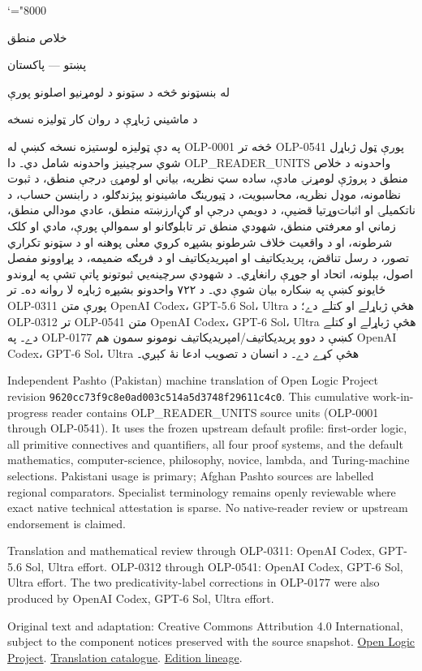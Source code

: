 \documentclass[11pt,a4paper,oneside]{report}
\theoremstyle{definition}
\begin{document}
\setRTL
\mathcode`\!="8000
\begin{titlepage}
\thispagestyle{empty}
\begin{center}
\vspace*{22mm}
{\Huge خلاص منطق}\par\bigskip
{\Large پښتو — پاکستان}\par\bigskip
{\LARGE له بنسټونو څخه د سټونو د لومړنيو اصلونو پورې}\par\bigskip
د ماشيني ژباړې د روان کار ټوليزه نسخه
\end{center}
\bigskip
په دې ټوليزه لوستيزه نسخه کښې له OLP-0001 څخه تر OLP-0541 پورې
ټول ژباړل شوي سرچينيز واحدونه شامل دي۔ دا OLP_READER_UNITS واحدونه د
خلاص منطق د پروژې لومړنۍ مادې، ساده سټ نظريه، بياني او لومړۍ درجې
منطق، د ثبوت نظامونه، موډل نظريه، محاسبويت، د ټيورينګ ماشينونو
پېژندګلو، د رابنسن حساب، د ناتکميلۍ او اثبات‌وړتيا قضيې، د دويمې درجې او
ګڼ‌ارزښته منطق، عادي مودالي منطق، زماني او معرفتي منطق، شهودي منطق
تر تابلوګانو او سموالې پورې، مادي او کلک شرطونه، او د واقعيت خلاف
شرطونو بشپړه کروي معنٰی پوهنه او د سټونو تکراري تصور،
د رسل تناقض، پريديکاتيف او امپريديکاتيف او د فرېګه ضميمه، د پړاوونو مفصل اصول، بېلونه، اتحاد او جوړې رانغاړي۔ د شهودي سرچينه‌يي ثبوتونو پاتې
تشې په اړوندو ځايونو کښې په ښکاره بيان شوې دي۔
د ۷۲۲ واحدونو بشپړه ژباړه لا روانه ده۔ تر OLP-0311 پورې متن
OpenAI Codex، GPT-5.6 Sol، Ultra هڅې ژباړلے او کتلے دے؛
د OLP-0312 تر OLP-0541 متن OpenAI Codex، GPT-6 Sol، Ultra
هڅې ژباړلے او کتلے دے۔ په OLP-0177 کښې د دوو پريديکاتيف/امپريديکاتيف
نومونو سمون هم OpenAI Codex، GPT-6 Sol، Ultra هڅې کړے دے۔
د انسان د تصويب ادعا نۀ کېږي۔

\begin{LTR}\latinfont\small
Independent Pashto (Pakistan) machine translation of Open Logic Project
revision \texttt{9620cc73f9c8e0ad003c514a5d3748f29611c4c0}. This cumulative
work-in-progress reader contains OLP_READER_UNITS source units (OLP-0001
through OLP-0541). It uses the frozen upstream default profile: first-order
logic, all primitive connectives and quantifiers, all four proof systems,
and the default mathematics, computer-science, philosophy, novice, lambda,
and Turing-machine selections. Pakistani usage is primary; Afghan Pashto
sources are labelled regional comparators. Specialist terminology remains
openly reviewable where exact native technical attestation is sparse. No
native-reader review or upstream endorsement is claimed.

Translation and mathematical review through OLP-0311: OpenAI Codex,
GPT-5.6 Sol, Ultra effort. OLP-0312 through OLP-0541: OpenAI Codex,
GPT-6 Sol, Ultra effort. The two predicativity-label corrections in
OLP-0177 were also produced by OpenAI Codex, GPT-6 Sol, Ultra effort.

Original text and adaptation: Creative Commons Attribution 4.0 International,
subject to the component notices preserved with the source snapshot.
\href{https://openlogicproject.org/}{Open Logic Project}.\quad
\href{https://github.com/KokunoYumeto/OpenLogic-translations}{Translation catalogue}.\quad
\href{https://doi.org/10.5281/zenodo.22307197}{Edition lineage}.
\end{LTR}
\end{titlepage}
\tableofcontents
\clearpage
\end{document}
